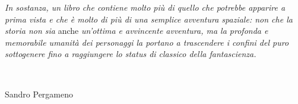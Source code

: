 {\emph{{In sostanza, un libro che contiene molto più di quello che
		potrebbe apparire a prima vista e che è molto di più di una semplice
		avventura spaziale: non che la storia non sia}}{ anche \emph{un'ottima e
		avvincente avventura, ma la profonda e memorabile umanità dei personaggi
		la portano a trascendere i confini del puro sottogenere fino a
		raggiungere lo status di classico della fantascienza.}}

{~}

{Sandro Pergameno}

}

